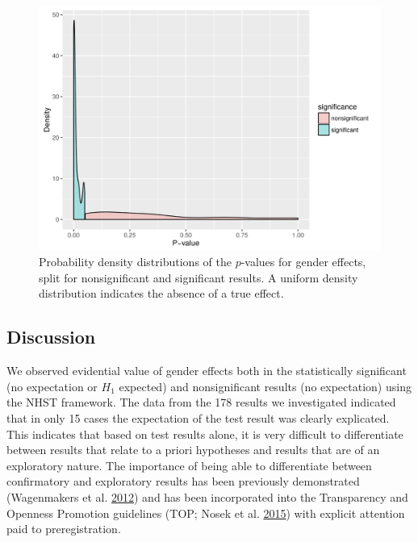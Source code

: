\documentclass[a5paper]{book}
\begin{document}
\begin{figure}[h]

{\centering \includegraphics[width=1\linewidth]{assets/figures/tgtbf-fig6.pdf.svg} 

}

\caption{Probability density distributions of the $p$-values for gender effects, split for nonsignificant and significant results. A uniform density distribution indicates the absence of a true effect.}\label{fig:tgtbf-fig6}
\end{figure}

\subsection{Discussion}\label{discussion-2}

We observed evidential value of gender effects both in the statistically
significant (no expectation or \(H_1\) expected) and nonsignificant
results (no expectation) using the NHST framework. The data from the 178
results we investigated indicated that in only 15 cases the expectation
of the test result was clearly explicated. This indicates that based on
test results alone, it is very difficult to differentiate between
results that relate to a priori hypotheses and results that are of an
exploratory nature. The importance of being able to differentiate
between confirmatory and exploratory results has been previously
demonstrated (Wagenmakers et al.
\protect\hyperlink{ref-doi:10.1177ux2f1745691612463078}{2012}) and has
been incorporated into the Transparency and Openness Promotion
guidelines (TOP; Nosek et al.
\protect\hyperlink{ref-doi:10.1126ux2fscience.aab2374}{2015}) with
explicit attention paid to preregistration.
\end{document}

